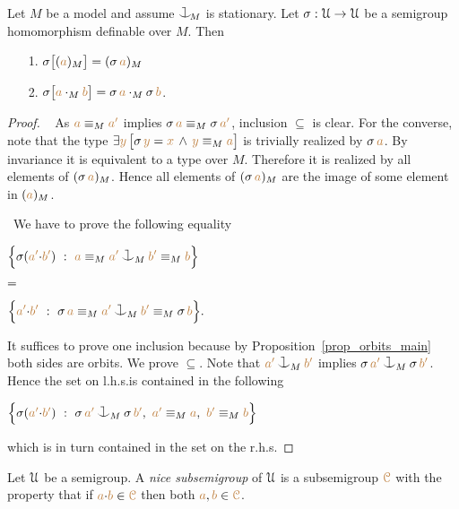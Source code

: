 \begin{proposition}\label{prop_HJ_tecnical}
Let $M$ be a model and assume $\cnonfork_{\!M}$ is stationary.
Let $\sigma:\EuScript U\to\EuScript U$ be a semigroup homomorphism definable over $M$.
Then 
\begin{itemize}
\item[1.] $\sigma\big[({\color{brown} a})_M\big]=(\sigma\,{\color{brown} a})_M$

\item[2.]
$\sigma\big[{\color{brown} a}\cdot_M{\color{brown} b}\big]=\sigma\,{\color{brown} a}\cdot_M\sigma\,{\color{brown} b}$.
\end{itemize}
\end{proposition}
\begin{proof}\   
As ${\color{brown} a}\equiv_M{\color{brown} a'}$ implies $\sigma\,{\color{brown} a}\equiv_M\sigma\,{\color{brown} a'}$,
inclusion $\subseteq$ is clear.
For the converse, note that the type 
$\exists{\color{brown}y}\,\big[\sigma\,{\color{brown} y}={\color{brown} x}\,\wedge\,{\color{brown} y}\equiv_M{\color{brown} a}\big]$ 
is trivially realized by $\sigma\,{\color{brown} a}$.
By invariance it is equivalent to a type over $M$.
Therefore it is realized by all elements of $(\sigma\,{\color{brown} a})_M$.
Hence all elements of $(\sigma\,{\color{brown} a})_M$ are the image of some element in $({\color{brown} a})_M$.

\def\medrel#1{\parbox[t]{6ex}{$\displaystyle\hfil #1$}}
\def\ceq#1#2#3{\parbox[t]{39ex}{$\displaystyle #1$}\medrel{#2}{$\displaystyle #3$}}
 \  
We have to prove the following equality\smallskip

\ceq{\hfill\Big\{\sigma({\mr a'}{\cdot}{\mr b'})\ :\ {\mr a}\equiv_M{\mr a'}\cnonfork_M{\mr b'}\equiv_M{\mr b} \Big\}}
{=}
{\Big\{{\mr a'}{\cdot}{\mr b'}\ :\ \sigma\,{\mr a}\equiv_M{\mr a'}\cnonfork_M{\mr b'}\equiv_M\sigma\,{\mr b} \Big\}.}\smallskip

It suffices to prove one inclusion because by Proposition~\ref{prop_orbits_main} both sides are orbits.
We prove $\subseteq$.
Note that ${\mr a'}\cnonfork_M{\mr b'}$ implies $\sigma\,{\mr a'}\cnonfork_M\sigma\,{\mr b'}$.
Hence the set on l.h.s.\@ is contained in the following\smallskip

\hfil$\Big\{\sigma({\mr a'}{\cdot}{\mr b'})\ :\ \sigma\,{\mr a'}\cnonfork_M\sigma\,{\mr b'},\ {\mr a'}\equiv_M{\mr a},\  {\mr b'}\equiv_M{\mr b} \Big\}$\smallskip

which is in turn contained in the set on the r.h.s.
\end{proof}
 
Let $\EuScript U$ be a semigroup.
A \emph{nice subsemigroup\/} of $\EuScript U$ is a subsemigroup ${\color{brown}\EuScript C}$ with the property that if ${\color{brown} a}{\cdot}{\color{brown} b}\in{\color{brown}\EuScript C}$ then both ${\color{brown} a},{\color{brown} b}\in {\color{brown}\EuScript C}$.

